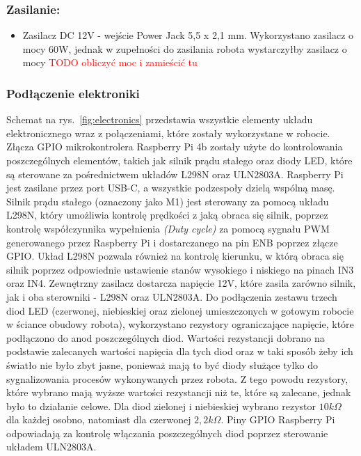 \subsubsection{Zasilanie:}
\begin{itemize}
    \item Zasilacz DC 12V - wejście Power Jack 5,5 x 2,1 mm. Wykorzystano zasilacz o mocy 60W, jednak w zupełności do zasilania robota wystarczyłby zasilacz o mocy \textcolor{red}{TODO obliczyć moc i zamieścić tu}
\end{itemize}

\subsubsection{Podłączenie elektroniki}

Schemat na rys.~\ref{fig:electronics} przedstawia wszystkie elementy układu elektronicznego wraz z połączeniami, które zostały wykorzystane w robocie.
Złącza GPIO mikrokontrolera Raspberry Pi 4b zostały użyte do kontrolowania poszczególnych elementów, takich jak silnik prądu stałego oraz diody LED, które są sterowane za 
pośrednictwem układów L298N oraz ULN2803A. Raspberry Pi jest zasilane przez port USB-C, a wszystkie podzespoły dzielą wspólną masę.
Silnik prądu stałego (oznaczony jako M1) jest sterowany za pomocą układu L298N, który umożliwia kontrolę prędkości z jaką obraca się silnik, poprzez kontrolę współczynnika wypełnienia \textit{(Duty cycle)} 
za pomocą sygnału PWM generowanego przez Raspberry Pi i dostarczanego na pin ENB poprzez złącze GPIO. Układ L298N pozwala również na kontrolę kierunku, w którą obraca się silnik poprzez
odpowiednie ustawienie stanów wysokiego i niskiego na pinach IN3 oraz IN4.
Zewnętrzny zasilacz dostarcza napięcie 12V, które zasila zarówno silnik, jak i oba sterowniki - L298N oraz ULN2803A.
Do podłączenia zestawu trzech diod LED (czerwonej, niebieskiej oraz zielonej umieszczonych w gotowym robocie w ściance obudowy robota), wykorzystano rezystory ograniczające napięcie, które podłączono 
do anod poszczególnych diod. Wartości rezystancji dobrano na podstawie zalecanych wartości napięcia dla tych diod oraz w taki sposób żeby ich światło nie było zbyt jasne, ponieważ 
mają to być diody służące tylko do sygnalizowania procesów wykonywanych przez robota. Z tego powodu rezystory, które wybrano mają wyższe wartości rezystancji niż te, które są zalecane, jednak było to
działanie celowe. Dla diod zielonej i niebieskiej wybrano rezystor $10k\Omega$ dla każdej osobno, natomiast dla czerwonej $2,2k\Omega$. Piny GPIO Raspberry Pi odpowiadają za kontrolę włączania poszczególnych diod poprzez sterowanie układem ULN2803A.
